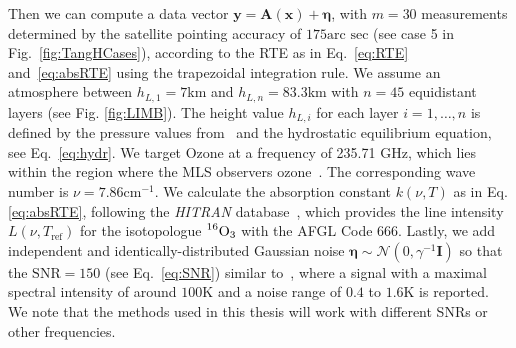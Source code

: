 Then we can compute a data vector $\bm{y} = \bm{A}(\bm{x}) + \bm{\eta} $, with $m = 30$ measurements determined by the satellite pointing accuracy of $175\text{arc sec}$ (see case 5 in Fig.~\ref{fig:TangHCases}), according to the RTE as in Eq.~\ref{eq:RTE} and~\ref{eq:absRTE} using the trapezoidal integration rule.
We assume an atmosphere between $h_{L,1}=7$km and $h_{L,n} = 83.3$km with $n = 45$ equidistant layers (see Fig. \ref{fig:LIMB}).
The height value $h_{L,i}$ for each layer $i = 1,\dots, n$ is defined by the pressure values from~\cite{MLSdata} and the hydrostatic equilibrium equation, see Eq.~\ref{eq:hydr}.
We target Ozone at a frequency of 235.71 GHz, which lies within the region where the MLS observers ozone~\cite{livesey2008ozonecarbonmono, waters2006earth}.
The corresponding wave number is $\nu = 7.86\text{cm}^{-1}$.
We calculate the absorption constant $k(\nu,T)$ as in Eq. \ref{eq:absRTE}, following the \textit{HITRAN} database~\cite{gordon2022hitran2020}, which provides the line intensity $L(\nu,T_{\text{ref}})$ for the isotopologue $\prescript{16}{}{\text{O}}_3$ with the AFGL Code 666.
Lastly, we add independent and identically-distributed Gaussian noise $\bm{\eta} \sim \mathcal{N}(0,\gamma^{-1} \bm{I})$ so that the $\text{SNR}=150$ (see Eq.~\ref{eq:SNR}) similar to~\cite{Froidevaux2008snrozone}, where a signal with a maximal spectral intensity of around $100\text{K}$ and a noise range of $0.4$ to $1.6\text{K}$ is reported.
We note that the methods used in this thesis will work with different SNRs or other frequencies.

